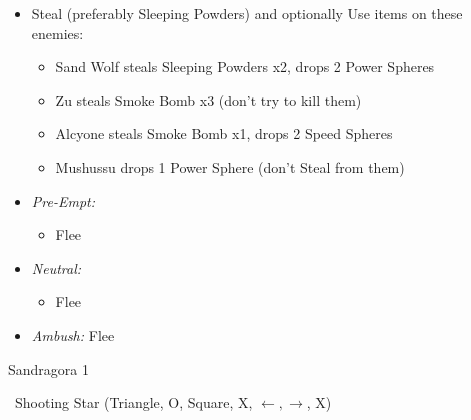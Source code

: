 \begin{encounters}
	\begin{itemize}
		\item Steal (preferably Sleeping Powders) and optionally Use items on these enemies:
		\begin{itemize}
			\item Sand Wolf steals Sleeping Powders x2, drops 2 Power Spheres
			\item Zu steals Smoke Bomb x3 (don't try to kill them)
			\item Alcyone steals Smoke Bomb x1, drops 2 Speed Spheres
			\item Mushussu drops 1 Power Sphere (don't Steal from them)
		\end{itemize}
		\item \textit{Pre-Empt:}
		      \begin{itemize}
			      \tidusf Defend
			      \rikkuf Steal or Use a Smoke Bomb/Silence Grenade/Sleeping Powder
			      \luluf Defend
			      \item Flee
		      \end{itemize}
		\item \textit{Neutral:}
		      \begin{itemize}
			      \switch{\tidus}{\kimahri}
			      \kimahrif Steal
				  \rikkuf Switch for \tidus\ or Use a Smoke Bomb/Silence Grenade/Sleeping Powder
			      \item Flee
		      \end{itemize}
		\item \textit{Ambush:} Flee
	\end{itemize}
\end{encounters}
\begin{battle}{Sandragora 1}
	\begin{itemize}
		\switch{\tidus}{\auron}
		\auronf \od\ Shooting Star (Triangle, O, Square, X, $\leftarrow, \rightarrow$, X)
	\end{itemize}
\end{battle}
